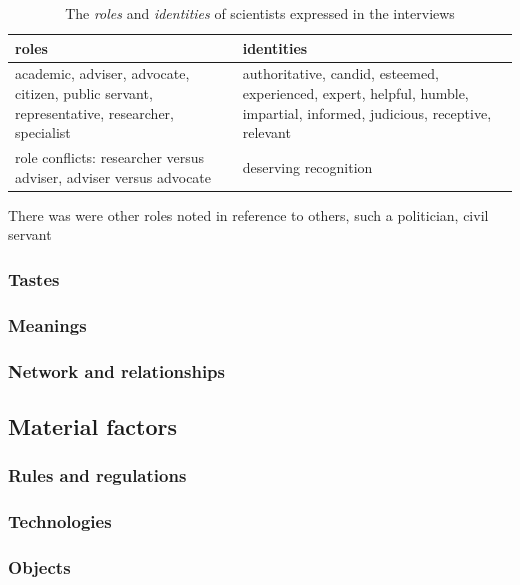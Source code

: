 \begin{table}[!ht]
\footnotesize
\caption{The \emph{roles} and \emph{identities} of scientists expressed in the interviews}\label{tab:resopinionleaders}
\begin{tabular}{p{.45\linewidth}p{.45\linewidth}}\hline
\textbf{roles} & \textbf{identities} \\ \hline\hline
academic, adviser, advocate, citizen, public servant, representative, researcher, specialist & authoritative, candid, esteemed, experienced, expert, helpful, humble, impartial, informed, judicious, receptive, relevant \\[5mm] \hline
role conflicts: researcher versus adviser, adviser versus advocate & deserving recognition \\[5mm] \hline
\end{tabular}
\end{table}



There was were other roles noted in reference to others, such a politician, civil servant

\subsubsection{Tastes}\label{sec:restastes}
\subsubsection{Meanings}\label{sec:resmeanings}
\subsubsection{Network and relationships}\label{sec:resnetwork}
\subsection{Material factors}\label{sec:resmaterial}
\subsubsection{Rules and regulations}\label{sec:resrules}
\subsubsection{Technologies}\label{sec:restechnologies}
\subsubsection{Objects}\label{sec:resobjects}
